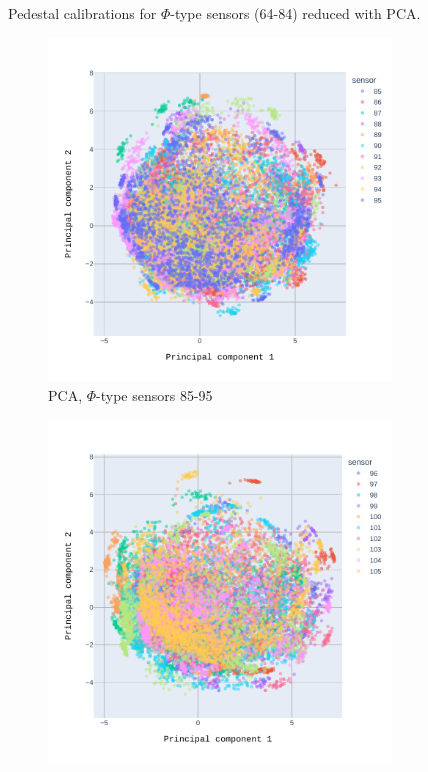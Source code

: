 \begin{figure}
\caption[All calibrationd]{Pedestal calibrations for $\Phi$-type sensors (64-84) reduced with PCA.}
    \label{plot:pca_all_ped_phia}
\end{figure}

 \begin{figure}
\centering
\begin{subfigure}[b]{0.7\textwidth}
    \centering
    \includegraphics[width=\linewidth]{figures/chapter4/dimred/PCA_pedestals_phi_2.pdf}
    \caption{PCA, $\Phi$-type sensors 85-95}
    \label{plot:PCA_pedestals_2_phi}
  \end{subfigure}
\begin{subfigure}[b]{0.7\textwidth}
    \centering
    \includegraphics[width=\linewidth]{figures/chapter4/dimred/PCA_pedestals_phi_3.pdf}

\end{subfigure}
\end{figure}
